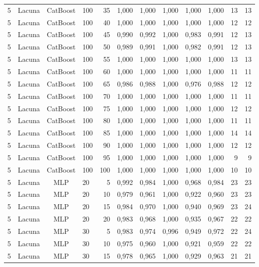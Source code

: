 \begin{longtable}{ccclrrrrrrrr}
5 & Lacuna & CatBoost & 100 & 35 & 1,000 & 1,000 & 1,000 & 1,000 & 1,000 & 13 & 13 \\
5 & Lacuna & CatBoost & 100 & 40 & 1,000 & 1,000 & 1,000 & 1,000 & 1,000 & 12 & 12 \\
5 & Lacuna & CatBoost & 100 & 45 & 0,990 & 0,992 & 1,000 & 0,983 & 0,991 & 12 & 13 \\
5 & Lacuna & CatBoost & 100 & 50 & 0,989 & 0,991 & 1,000 & 0,982 & 0,991 & 12 & 13 \\
5 & Lacuna & CatBoost & 100 & 55 & 1,000 & 1,000 & 1,000 & 1,000 & 1,000 & 13 & 13 \\
5 & Lacuna & CatBoost & 100 & 60 & 1,000 & 1,000 & 1,000 & 1,000 & 1,000 & 11 & 11 \\
5 & Lacuna & CatBoost & 100 & 65 & 0,986 & 0,988 & 1,000 & 0,976 & 0,988 & 12 & 12 \\
5 & Lacuna & CatBoost & 100 & 70 & 1,000 & 1,000 & 1,000 & 1,000 & 1,000 & 11 & 11 \\
5 & Lacuna & CatBoost & 100 & 75 & 1,000 & 1,000 & 1,000 & 1,000 & 1,000 & 12 & 12 \\
5 & Lacuna & CatBoost & 100 & 80 & 1,000 & 1,000 & 1,000 & 1,000 & 1,000 & 11 & 11 \\
5 & Lacuna & CatBoost & 100 & 85 & 1,000 & 1,000 & 1,000 & 1,000 & 1,000 & 14 & 14 \\
5 & Lacuna & CatBoost & 100 & 90 & 1,000 & 1,000 & 1,000 & 1,000 & 1,000 & 12 & 12 \\
5 & Lacuna & CatBoost & 100 & 95 & 1,000 & 1,000 & 1,000 & 1,000 & 1,000 & 9 & 9 \\
5 & Lacuna & CatBoost & 100 & 100 & 1,000 & 1,000 & 1,000 & 1,000 & 1,000 & 10 & 10 \\
5 & Lacuna & MLP & 20 & 5 & 0,992 & 0,984 & 1,000 & 0,968 & 0,984 & 23 & 23 \\
5 & Lacuna & MLP & 20 & 10 & 0,979 & 0,961 & 1,000 & 0,922 & 0,960 & 23 & 23 \\
5 & Lacuna & MLP & 20 & 15 & 0,984 & 0,970 & 1,000 & 0,940 & 0,969 & 23 & 24 \\
5 & Lacuna & MLP & 20 & 20 & 0,983 & 0,968 & 1,000 & 0,935 & 0,967 & 22 & 22 \\
5 & Lacuna & MLP & 30 & 5 & 0,983 & 0,974 & 0,996 & 0,949 & 0,972 & 22 & 24 \\
5 & Lacuna & MLP & 30 & 10 & 0,975 & 0,960 & 1,000 & 0,921 & 0,959 & 22 & 22 \\
5 & Lacuna & MLP & 30 & 15 & 0,978 & 0,965 & 1,000 & 0,929 & 0,963 & 21 & 21 \\

\end{longtable}
